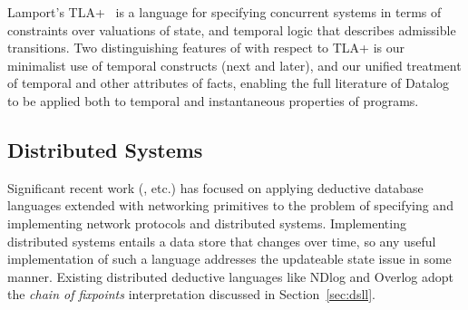 Lamport's TLA+~\cite{tla} is a language for specifying 
concurrent systems in terms of constraints over valuations of state, and temporal logic that describes admissible transitions.  
Two distinguishing features of \lang with respect to TLA+ is our minimalist use of temporal constructs (next and later), and our unified treatment of temporal and other attributes of facts, enabling the full literature of Datalog to be applied both to temporal and instantaneous properties of programs.

\subsection{Distributed Systems}

Significant recent work (\cite{boom-eurosys,Belaramani:2009,Chu:2007,Loo2009-CACM}, etc.) has focused on applying deductive database languages extended with networking 
primitives to the problem of specifying and implementing network protocols and distributed systems.  Implementing distributed systems entails 
a data store that changes over time, so any useful implementation of such a language addresses the updateable state issue in some manner. 
Existing distributed deductive languages like NDlog and Overlog adopt the \emph{chain of fixpoints} interpretation discussed in Section~\ref{sec:dsll}.

